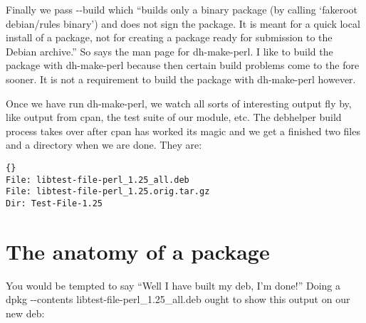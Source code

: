 F\hbox{}inally we pass {-}{-}build which ``builds only a binary package (by calling
`fakeroot debian/rules binary') and does not sign the package. It is meant for a
quick local install of a package, not for creating a package ready for
submission to the Debian archive.'' So says the man page for dh-make-perl. I
like to build the package with dh-make-perl because then certain build problems
come to the fore sooner. It is not a requirement to build the package with
dh-make-perl however.

Once we have run dh-make-perl, we watch all sorts of interesting output f\hbox{}ly by,
like output from cpan, the test suite of our module, etc. The debhelper build
process takes over after cpan has worked its magic and we get a f\hbox{}inished two
f\hbox{}iles and a directory when we are done. They are:

\begin{lstlisting}[frame=trbl,label=cl:debs_cpan:dh-make-perl-output,caption=dh-make-perl output]{}
File: libtest-file-perl_1.25_all.deb
File: libtest-file-perl_1.25.orig.tar.gz
Dir: Test-File-1.25
\end{lstlisting}



\section{The anatomy of a package}
\label{s:debs_cpan:anatomy}

You would be tempted to say ``Well I have built my deb, I'm done!'' Doing a dpkg
{-}{-}contents libtest-f\hbox{}ile-perl\_1.25\_all.deb ought to show this output on our new
deb:

